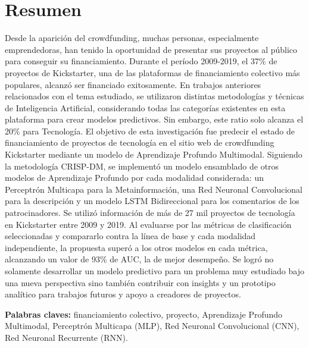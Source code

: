 
\chapter*{Resumen}

Desde la aparición del crowdfunding, muchas personas, especialmente emprendedoras, han tenido la oportunidad de presentar sus proyectos al público para conseguir su financiamiento. Durante el período 2009-2019, el 37\% de proyectos de Kickstarter, una de las plataformas de financiamiento colectivo más populares, alcanzó ser financiado exitosamente. En trabajos anteriores relacionados con el tema estudiado, se utilizaron distintas metodologías y técnicas de Inteligencia Artificial, considerando todas las categorías existentes en esta plataforma para crear modelos predictivos. Sin embargo, este ratio solo alcanza el 20\% para Tecnología. El objetivo de esta investigación fue predecir el estado de financiamiento de proyectos de tecnología en el sitio web de crowdfunding Kickstarter mediante un modelo de Aprendizaje Profundo Multimodal. Siguiendo la metodología CRISP-DM, se implementó un modelo ensamblado de otros modelos de Aprendizaje Profundo por cada modalidad considerada: un Perceptrón Multicapa para la Metainformación, una Red Neuronal Convolucional para la descripción y un modelo LSTM Bidireccional para los comentarios de los patrocinadores. Se utilizó información de más de 27 mil proyectos de tecnología en Kickstarter entre 2009 y 2019. Al evaluarse por las métricas de clasificación seleccionadas y compararlo contra la línea de base y cada modalidad independiente, la propuesta superó a los otros modelos en cada métrica, alcanzando un valor de 93\% de AUC, la de mejor desempeño. Se logró no solamente desarrollar un modelo predictivo para un problema muy estudiado bajo una nueva perspectiva sino también contribuir con insights y un prototipo analítico para trabajos futuros y apoyo a creadores de proyectos.

\textbf{Palabras claves: } financiamiento colectivo, proyecto, Aprendizaje Profundo Multimodal, Perceptrón Multicapa (MLP), Red Neuronal Convolucional (CNN), Red Neuronal Recurrente (RNN).

\clearpage
